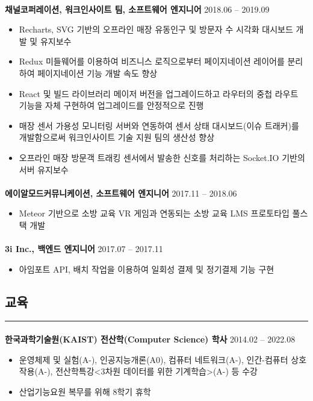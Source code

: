 \documentclass{article}
\begin{document}
\paragraph{}
\textbf{채널코퍼레이션, 워크인사이트 팀, 소프트웨어 엔지니어} \hfill 2018.06 -- 2019.09
\begin{itemize}
     \setlength\itemsep{0.1em}
     \item Recharts, SVG 기반의 오프라인 매장 유동인구 및 방문자 수 시각화 대시보드 개발 및 유지보수
     \item Redux 미들웨어를 이용하여 비즈니스 로직으로부터 페이지네이션 레이어를 분리하여 페이지네이션 기능 개발 속도 향상
     \item React 및 빌드 라이브러리 메이저 버전을 업그레이드하고 라우터의 중첩 라우트 기능을 자체 구현하여 업그레이드를 안정적으로 진행
     \item 매장 센서 가용성 모니터링 서버와 연동하여 센서 상태 대시보드(이슈 트래커)를 개발함으로써 워크인사이트 기술 지원 팀의 생산성 향상
     \item 오프라인 매장 방문객 트래킹 센서에서 발송한 신호를 처리하는 Socket.IO 기반의 서버 유지보수
\end{itemize}
\paragraph{}
\textbf{에이알모드커뮤니케이션, 소프트웨어 엔지니어} \hfill 2017.11 -- 2018.06
\begin{itemize}
    \setlength\itemsep{0.1em}
     \item Meteor 기반으로 소방 교육 VR 게임과 연동되는 소방 교육 LMS 프로토타입 풀스택 개발
\end{itemize}
\paragraph{}
\textbf{3i Inc., 백엔드 엔지니어} \hfill 2017.07 -- 2017.11
\begin{itemize}
    \setlength\itemsep{0.1em}
     \item 아임포트 API, 배치 작업을 이용하여 일회성 결제 및 정기결제 기능 구현
\end{itemize}

\begin{center}
    \section*{교육}
\end{center}
\hrule
\paragraph{\newline \newline}
\textbf{한국과학기술원(KAIST) 전산학(Computer Science) 학사} \hfill 2014.02 -- 2022.08
\begin{itemize}
    \setlength\itemsep{0.1em}
    \item 운영체제 및 실험(A-), 인공지능개론(A0), 컴퓨터 네트워크(A-), 인간-컴퓨터 상호작용(A-), 전산학특강<3차원 데이터를 위한 기계학습>(A-) 등 수강
    \item 산업기능요원 복무를 위해 8학기 휴학
\end{itemize}
\end{document}
